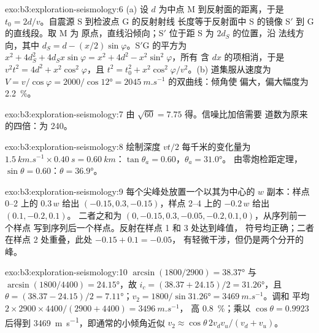 \begin{solution}{exo:b3:exploration-seismology:6}
(a) 设 $d$ 为中点 M 到反射面的距离，于是
$t_0 = 2d/v$。自震源 S 到检波点 G 的反射射线
长度等于反射面中 S 的镜像 S$'$ 到 G 的直线段。取 M 为
原点，直线沿倾向；S$'$ 位于距 S 为 $2d_S$ 的位置，沿
法线方向，其中 $d_S = d - (x/2)\sin\varphi$。S$'$G 的平方为
$x^2 + 4d_S^2 + 4d_Sx\sin\varphi = x^2 + 4d^2 - x^2\sin^2\varphi$，所有
含 $dx$ 的项相消，于是 $v^2t^2 = 4d^2 + x^2\cos^2\varphi$，且
$t^2 = t_0^2 + x^2\cos^2\varphi/v^2$。(b) 道集服从速度为
$V = v/\cos\varphi = 2000/\cos\ang{12} = \qty{2045}{m.s^{-1}}$ 的双曲线：倾角使
偏大，偏大幅度为 \qty{2.2}{\percent}。
\end{solution}

\begin{solution}{exo:b3:exploration-seismology:7}
由 $\sqrt{60} = 7.75$ 得。信噪比加倍需要
道数为原来的四倍：为 240。
\end{solution}

\begin{solution}{exo:b3:exploration-seismology:8}
绘制深度 $vt/2$ 每千米的变化量为 $\qty{1.5}{km.s^{-1}}\times\qty{0.40}{s}
= \qty{0.60}{km}$：$\tan\theta_a = 0.60$，$\theta_a = \ang{31.0}$。
由零炮检距定理，$\sin\theta = 0.60$：$\theta = \ang{36.9}$。
\end{solution}

\begin{solution}{exo:b3:exploration-seismology:9}
每个尖峰处放置一个以其为中心的 $w$ 副本：样点 0--2 上的 $0.3\,w$ 给出
$(-0.15, 0.3, -0.15)$，样点 2--4 上的 $-0.2\,w$ 给出 $(0.1, -0.2, 0.1)$。
二者之和为 $(0, -0.15, 0.3, -0.05, -0.2, 0.1, 0)$，从序列前一个样点
写到序列后一个样点。反射在样点 1 和 3 处达到峰值，
符号均正确；二者在样点 2 处重叠，此处 $-0.15 + 0.1 = -0.05$，
有轻微干涉，但仍是两个分开的峰。
\end{solution}

\begin{solution}{exo:b3:exploration-seismology:10}
$\arcsin(1800/2900) = \ang{38.37}$ 与 $\arcsin(1800/4400) = \ang{24.15}$，故
$i_c = (38.37 + 24.15)/2 = \ang{31.26}$，且 $\theta = (38.37 - 24.15)/2 =
\ang{7.11}$；$v_2 = 1800/\sin\ang{31.26} = \qty{3469}{m.s^{-1}}$。调和
平均 $2\times2900\times4400/(2900 + 4400) = \qty{3496}{m.s^{-1}}$，
高 \qty{0.8}{\percent}；乘以 $\cos\theta = 0.9923$ 后得到
\qty{3469}{m.s^{-1}}，即通常的小倾角近似
$v_2 \approx \cos\theta\,2v_dv_u/(v_d + v_u)$。
\end{solution}

